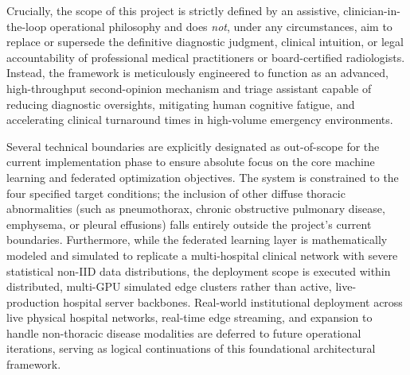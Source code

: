 Crucially, the scope of this project is strictly defined by an assistive, clinician-in-the-loop operational philosophy and does \emph{not}, under any circumstances, aim to replace or supersede the definitive diagnostic judgment, clinical intuition, or legal accountability of professional medical practitioners or board-certified radiologists. Instead, the framework is meticulously engineered to function as an advanced, high-throughput second-opinion mechanism and triage assistant capable of reducing diagnostic oversights, mitigating human cognitive fatigue, and accelerating clinical turnaround times in high-volume emergency environments. 

Several technical boundaries are explicitly designated as out-of-scope for the current implementation phase to ensure absolute focus on the core machine learning and federated optimization objectives. The system is constrained to the four specified target conditions; the inclusion of other diffuse thoracic abnormalities (such as pneumothorax, chronic obstructive pulmonary disease, emphysema, or pleural effusions) falls entirely outside the project's current boundaries. Furthermore, while the federated learning layer is mathematically modeled and simulated to replicate a multi-hospital clinical network with severe statistical non-IID data distributions, the deployment scope is executed within distributed, multi-GPU simulated edge clusters rather than active, live-production hospital server backbones. Real-world institutional deployment across live physical hospital networks, real-time edge streaming, and expansion to handle non-thoracic disease modalities are deferred to future operational iterations, serving as logical continuations of this foundational architectural framework.


